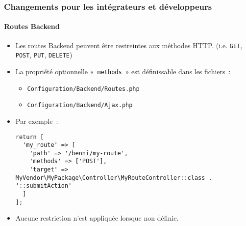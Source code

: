 %

\begin{frame}[fragile]
	\frametitle{Changements pour les intégrateurs et développeurs}
	\framesubtitle{Routes Backend}


	\begin{itemize}
		\item Les routes Backend peuvent être restreintes aux méthodes HTTP.\newline
			\small(i.e. \texttt{GET}, \texttt{POST}, \texttt{PUT}, \texttt{DELETE})
		\item La propriété optionnelle «~\texttt{methods}~» est définissable dans les fichiers~:
			\begin{itemize}\smaller
				\item \texttt{Configuration/Backend/Routes.php}
				\item \texttt{Configuration/Backend/Ajax.php}
			\end{itemize}
			\vspace{0.2cm}
		\item Par exemple~:
\begin{lstlisting}
return [
  'my_route' => [
    'path' => '/benni/my-route',
    'methods' => ['POST'],
    'target' => MyVendor\MyPackage\Controller\MyRouteController::class . '::submitAction'
  ]
];
\end{lstlisting}

		\item Aucune restriction n'est appliquée lorsque non définie.

	\end{itemize}

\end{frame}


